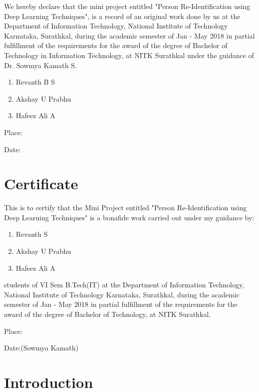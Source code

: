 \documentclass{article}[12pt,a4paper]
\begin{document}
We hereby declare that the mini project entitled "Person Re-Identification using Deep Learning Techniques", is a record of an original work done by us at the Department of Information Technology, National Institute of Technology Karnataka, Surathkal, during the academic semester of Jan - May 2018 in partial fulfillment of the requirements for the award of the degree of Bachelor of Technology in Information Technology, at NITK Surathkal under the guidance of Dr. Sowmya Kamath S.

\begin{enumerate}
    \item Revanth B S
    \item Akshay U Prabhu
    \item Hafeez Ali A
\end{enumerate}

\vspace{3em}
Place:

Date:

\newpage
\section*{Certificate}

This is to certify that the Mini Project entitled "Person Re-Identification using Deep Learning Techniques" is a bonafide work carried out under my guidance by:

\begin{enumerate}
    \item Revanth  S
    \item Akshay U Prabhu
    \item Hafeez Ali A
\end{enumerate}

students of VI Sem B.Tech(IT) at the Department of Information Technology, National Institute of Technology Karnataka, Surathkal,  during the academic semester of Jan - May 2018 in partial fulfillment of the requirements for the award of the degree of Bachelor of Technology, at NITK Surathkal.

\vspace{3em}
Place:

Date:\hfill (Sowmya Kamath)


\newpage
\tableofcontents
\newpage
\listoffigures
\newpage
\listoftables
\thispagestyle{empty}
\newpage
{}

\section{Introduction}
\end{document}
